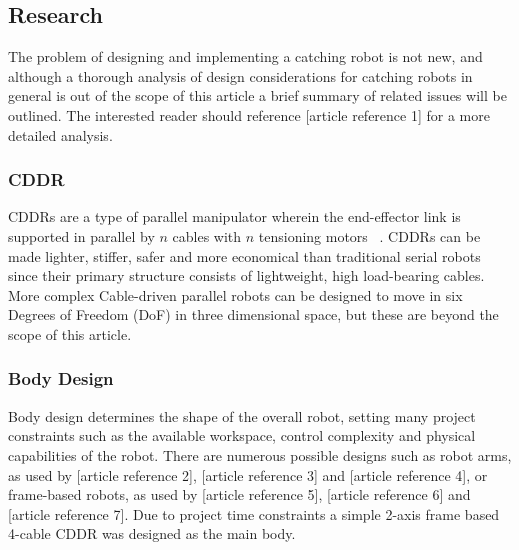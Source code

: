 \documentclass[conference]{IEEEtran}
\begin{document}
\subsection{Research}
The problem of designing and implementing a catching robot is not new, and although a thorough analysis of design considerations for catching robots in general is out of the scope of this article a brief summary of related issues will be outlined. The interested reader should reference [article reference 1] for a more detailed analysis.
\subsubsection{CDDR}
CDDRs are a type of parallel manipulator wherein the end-effector link is supported in parallel by $n$ cables with $n$ tensioning motors ~\cite{CDDR:description}. CDDRs can be made lighter, stiffer, safer and more economical than traditional serial robots~\cite{WilliamsII2003} since their primary structure consists of lightweight, high load-bearing cables. More complex Cable-driven parallel robots can be designed to move in six Degrees of Freedom (DoF) in three dimensional space, but these are beyond the scope of this article. 

\subsubsection{Body Design}
Body design determines the shape of the overall robot, setting many project constraints such as the available workspace, control complexity and physical capabilities of the robot. There are numerous possible designs such as robot arms, as used by [article reference 2], [article reference 3] and [article reference 4], or frame-based robots, as used by [article reference 5], [article reference 6] and [article reference 7]. Due to project time constraints a simple 2-axis frame based 4-cable CDDR was designed as the main body.
\end{document}
